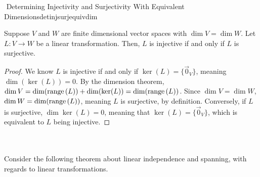         \begin{theorem}{\Stop\,\,Determining Injectivity and Surjectivity With Equivalent Dimensions}{detinjsurjequivdim}
            
            Suppose \(V\) and \(W\) are finite dimensional vector spaces with \(\dim V=\dim W\). Let \(L:V\to W\) be a linear transformation. Then, \(L\) is injective if and only if \(L\) is surjective.
            \begin{proof}
                We know \(L\) is injective if and only if \(\ker(L)=\{\vec{0}_V\}\), meaning \(\dim (\ker(L))=0\). By the dimension theorem, \(\dim V=\dim(\text{range\,}(L))+\dim(\ker(L))=\dim(\text{range\,}(L))\). Since \(\dim V=\dim W\), \(\dim W=\dim(\text{range\,}(L))\), meaning \(L\) is surjective, by definition. Conversely, if \(L\) is surjective, \(\dim\ker(L)=0\), meaning that \(\ker(L)=\{\vec{0}_V\}\), which is equivalent to \(L\) being injective.
            \end{proof}

        \end{theorem}
        \pagebreak
        \vphantom
        \\
        \\
        Consider the following theorem about linear independence and spanning, with regards to linear transformations.
